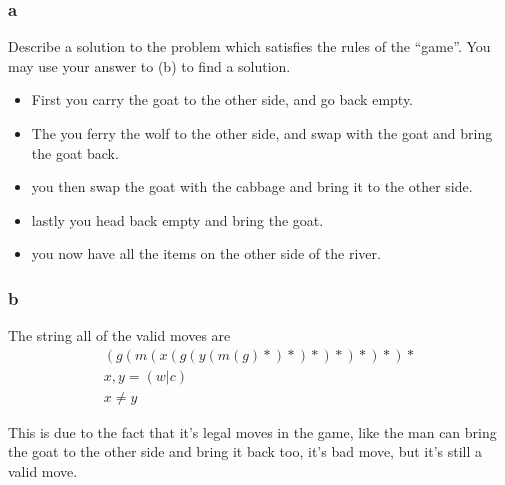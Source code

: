 \documentclass[a4paper,10pt,titlepage]{report}
\begin{document}
\subsubsection{a} Describe a solution to the problem which satisfies the rules of the “game”. You may use your answer to (b) to find a solution. \\

\begin{itemize}
\item First you carry the goat to the other side, and go back empty.
\item The you ferry the wolf to the other side, and swap with the goat and bring the goat back.
\item you then swap the goat with the cabbage and bring it to the other side.
\item lastly you head back empty and bring the goat.
\item you now have all the items on the other side of the river.
\end{itemize}


\subsubsection{b}
The string all of the valid moves are 
\begin{equation}
\begin{split}
(g(m(x(g(y(m(g)*)*)*)*)*)*)* \\
x,y = (w|c) \\
x \neq y
\end{split}
\end{equation}


\vspace{5mm}
This is due to the fact that it's legal moves in the game, like the man can bring the goat to the other side and bring it back too, it's bad move, but it's still a valid move. \\

\end{document}
